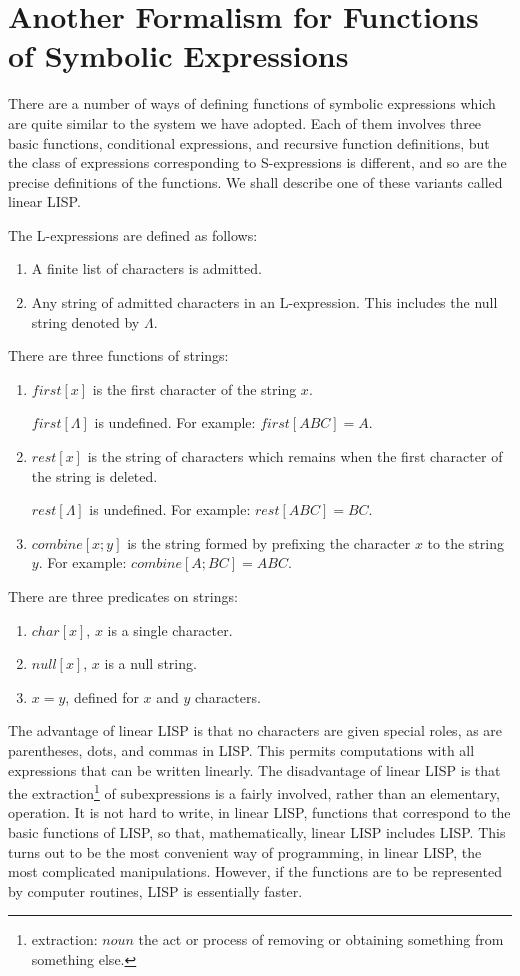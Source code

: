 \documentclass[11pt, a4paper]{article}
\begin{document}
\section{Another Formalism for Functions of Symbolic Expressions}

There are a number of ways of defining functions of symbolic expressions which
are quite similar to the system we have adopted. Each of them involves three
basic functions, conditional expressions, and recursive function definitions,
but the class of expressions corresponding to S-expressions is different, and so
are the precise definitions of the functions. We shall describe one of these
variants called linear LISP.

The L-expressions are defined as follows:
\begin{enumerate}
\item A finite list of characters is admitted.
\item Any string of admitted characters in an L-expression. This includes the
  null string denoted by $\Lambda$.
\end{enumerate}

There are three functions of strings:
\begin{enumerate}
\item $first[x]$ is the first character of the string $x$.

  $first[\Lambda]$ is undefined. For example: $first[ABC] = A$.
\item $rest[x]$ is the string of characters which remains when the first
  character of the string is deleted.

  $rest[\Lambda]$ is undefined. For example: $rest[ABC] = BC$.
\item $combine[x; y]$ is the string formed by prefixing the character $x$ to the
  string $y$. For example: $combine[A; BC] = ABC$.
\end{enumerate}

There are three predicates on strings:
\begin{enumerate}
\item $char[x]$, $x$ is a single character.
\item $null[x]$, $x$ is a null string.
\item $x = y$, defined for $x$ and $y$ characters.
\end{enumerate}

The advantage of linear LISP is that no characters are given special roles, as
are parentheses, dots, and commas in LISP. This permits computations with all
expressions that can be written linearly. The disadvantage of linear LISP is
that the
extraction\footnote{extraction: $noun$ the act or process of removing or
  obtaining something from something else.}
of subexpressions is a fairly involved, rather than an
elementary, operation. It is not hard to write, in linear LISP, functions that
correspond to the basic functions of LISP, so that, mathematically, linear LISP
includes LISP. This turns out to be the most convenient way of programming, in
linear LISP, the most complicated manipulations. However, if the functions are
to be represented by computer routines, LISP is essentially faster.
\end{document}
